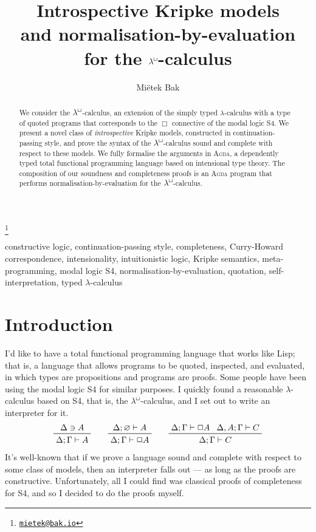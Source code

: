 \documentclass{entcs}
\numberwithin{equation}{thm}
\newcommand{\lambdabox}{\lambda^{\mkern-1mu\sq\mkern-2mu}}
\renewcommand{\:}{\mathrel{:}}
\newcommand{\0}{\varnothing}
\renewcommand{\and}{\mathbin{\wedge}}
\newcommand{\sq}{\Box}
\renewcommand{\e}{\mathrel{\vdash}}
\begin{document}
\begin{frontmatter}

\title{Introspective Kripke models\\and normalisation-by-evaluation\\for the $\lambdabox$-calculus}

\author{Mi\"{e}tek Bak}

\address{Least Fixed Ltd, Cambridge, UK}

\thanks[email]{\href{mailto:mietek@bak.io}{\textnormal{\texttt{mietek@bak.io}}}}


\begin{abstract}
  We consider the $\lambdabox$-calculus, an extension of the simply typed $\lambda$-calculus with a type of quoted programs that corresponds to the $\sq$ connective of the modal logic S4.  We present a novel class of \emph{introspective} Kripke models, constructed in continuation-passing style, and prove the syntax of the $\lambdabox$-calculus sound and complete with respect to these models.  We fully formalise the arguments in \textsc{Agda}, a dependently typed total functional programming language based on intensional type theory.  The composition of our soundness and completeness proofs is an \textsc{Agda} program that performs normalisation-by-evaluation for the $\lambdabox$-calculus.
\end{abstract}

\begin{keyword}
  constructive logic, continuation-passing style, completeness, Curry-Howard correspondence, intensionality, intuitionistic logic, Kripke semantics, meta-programming, modal logic S4, normalisation-by-evaluation, quotation, self-interpretation, typed $\lambda$-calculus
\end{keyword}

\end{frontmatter}




\section{Introduction}


I'd like to have a total functional programming language that works like Lisp; that is, a language that allows programs to be quoted, inspected, and evaluated, in which types are propositions and programs are proofs.  Some people have been using the modal logic S4 for similar purposes.  I quickly found a reasonable $\lambda$-calculus based on S4, that is, the $\lambdabox$-calculus, and I set out to write an interpreter for it.
\begin{gather*}
  \prftree{\Delta \ni A}{\Delta; \Gamma \e A}\qquad
  \prftree{\Delta; \0 \e A}{\Delta; \Gamma \e \sq A}\qquad
  \prftree{\Delta; \Gamma \e \sq A}{\Delta, A; \Gamma \e C}{\Delta; \Gamma \e C}
\end{gather*}
It's well-known that if we prove a language sound and complete with respect to some class of models, then an interpreter falls out --- as long as the proofs are constructive.  Unfortunately, all I could find was classical proofs of completeness for S4, and so I decided to do the proofs myself.
\end{document}
